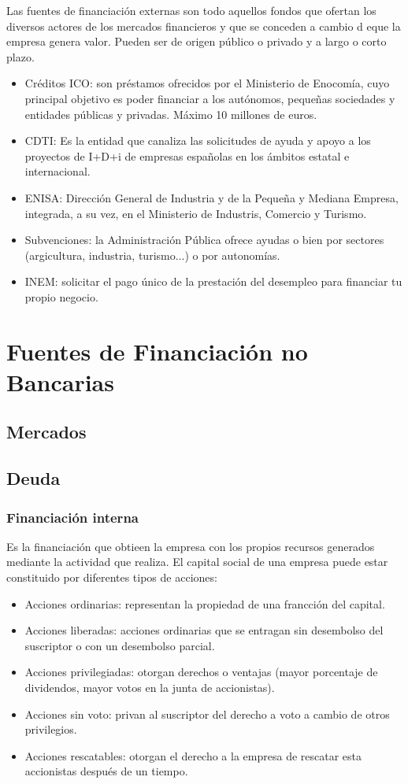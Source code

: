 Las fuentes de financiación externas son todo aquellos fondos que ofertan los diversos actores de los mercados financieros y que se conceden a cambio d eque la empresa genera valor. Pueden ser de origen público o privado y a largo o corto plazo.
\begin{itemize}
    \item Créditos ICO: son préstamos ofrecidos por el Ministerio de Enocomía, cuyo principal objetivo es poder financiar a los autónomos, pequeñas sociedades y entidades públicas y privadas. Máximo 10 millones de euros.
    \item CDTI: Es la entidad que canaliza las solicitudes de ayuda y apoyo a los proyectos de I+D+i de empresas españolas en los ámbitos estatal e internacional.
    \item ENISA: Dirección General de Industria y de la Pequeña y Mediana Empresa, integrada, a su vez, en el Ministerio de Industris, Comercio y Turismo.
    \item Subvenciones: la Administración Pública ofrece ayudas o bien por sectores (argicultura, industria, turismo...) o por autonomías.
    \item INEM: solicitar el pago único de la prestación del desempleo para financiar tu propio negocio. 
\end{itemize}

\section{Fuentes de Financiación no Bancarias}
\subsection{Mercados}

\subsection{Deuda}
\subsubsection{Financiación interna}
Es la financiación que obtieen la empresa con los propios recursos generados mediante la actividad que realiza. El capital social de una empresa puede estar constituido por diferentes tipos de acciones:
\begin{itemize}
    \item Acciones ordinarias: representan la propiedad de una francción del capital.
    \item Acciones liberadas: acciones ordinarias que se entragan sin desembolso del suscriptor o con un desembolso parcial.
    \item Acciones privilegiadas: otorgan derechos o ventajas (mayor porcentaje de dividendos, mayor votos en la junta de accionistas).
    \item Acciones sin voto: privan al suscriptor del derecho a voto a cambio de otros privilegios.
    \item Acciones rescatables: otorgan el derecho a la empresa de rescatar esta accionistas después de un tiempo.
\end{itemize}

